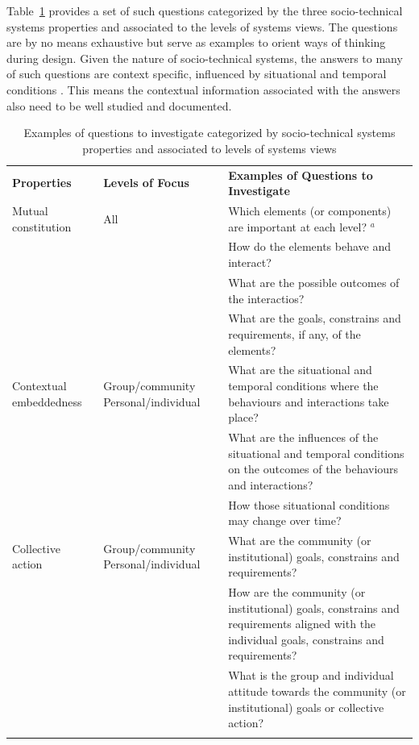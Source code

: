 Table~\ref{tab:questions} provides a set of such questions categorized by the three socio-technical systems properties and associated to the levels of systems views. The questions are by no means exhaustive but serve as examples to orient ways of thinking during design. 
Given the nature of socio-technical systems, the answers to many of such questions are context specific, influenced by situational and temporal conditions \cite{Baxter2011,Norman2015}. This means the contextual information associated with the answers also need to be well studied and documented. 
% 
\begin{table}
\caption{Examples of questions to investigate categorized by socio-technical systems properties and associated to levels of systems views }
\label{tab:questions}       %
%
%
\begin{tabular}{>{\raggedright}p{2.2cm}>{\raggedright}p{2.8cm}p{6.3cm}}
\hline\noalign{\smallskip}
\textbf{Properties}  & \textbf{Levels of Focus} &   \textbf{Examples of Questions to Investigate} \\
\noalign{\smallskip}\svhline\noalign{\smallskip}
Mutual constitution & All  & Which elements (or components) are important at each level? $^a$  \\
 &  & How do the elements behave and interact?\\
 &  & What are the possible outcomes of the interactios?\\
 &  & What are the goals, constrains and requirements, if any, of the elements?\\ \hline\noalign{\smallskip}
Contextual embeddedness &   Group/community Personal/individual & What are the situational and temporal conditions where the behaviours and interactions take place? \\
 &  & What are the influences of  the situational and temporal conditions on the outcomes of the behaviours and interactions?\\
 &  & How those situational conditions may change over time?\\ \hline\noalign{\smallskip}
Collective action   & Group/community Personal/individual& What are the community (or institutional) goals, constrains and requirements?\\
   &    & How are the community (or institutional) goals, constrains and requirements aligned with the individual goals, constrains and requirements? \\
   & & What is the group and individual attitude towards the community (or institutional) goals or collective action? \\ \hline\noalign{\smallskip}

\end{tabular}
\end{table}
